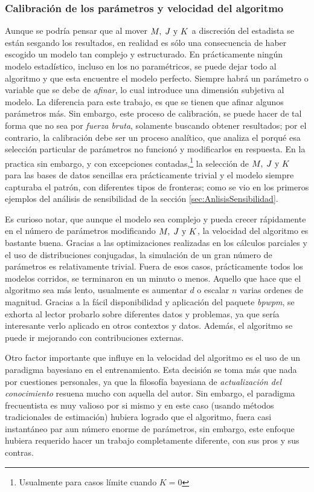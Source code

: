 \documentclass[../Main/Main.tex]{subfiles}
\begin{document}
\subsubsection*{Calibración de los parámetros y velocidad del algoritmo}
Aunque se podría pensar que al mover $M,\;J\text{ y }K$ a discreción del estadista se están sesgando los resultados, en realidad es sólo una consecuencia de haber escogido un modelo tan complejo y estructurado. En prácticamente ningún modelo estadístico, incluso en los no paramétricos, se puede dejar todo al algoritmo y que esta encuentre el modelo perfecto. Siempre habrá un parámetro o variable que se debe de \textit{afinar}, lo cual introduce una dimensión subjetiva al modelo. La diferencia para este trabajo, es que se tienen que afinar algunos parámetros más. Sin embargo, este proceso de calibración, se puede hacer de tal forma que no sea por \textit{fuerza bruta}, solamente buscando obtener resultados; por el contrario, la calibración debe ser un proceso analítico, que analiza el porqué esa selección particular de parámetros no funcionó y modificarlos en respuesta. En la practica sin embargo, y con excepciones contadas,\footnote{Usualmente para casos límite cuando $K = 0$} la selección de $M,\;J\text{ y }K$ para las bases de datos sencillas era prácticamente trivial y el modelo siempre capturaba el patrón, con diferentes tipos de fronteras; como se vio en los primeros ejemplos del análisis de sensibilidad de la sección \ref{sec:AnlisisSensibilidad}.

Es curioso notar, que aunque el modelo sea complejo y pueda crecer rápidamente en el número de parámetros modificando $M,\;J\text{ y }K$, la velocidad del algoritmo es bastante buena. Gracias a las optimizaciones realizadas en los cálculos parciales y el uso de distribuciones conjugadas, la simulación de un gran número de parámetros es relativamente trivial. Fuera de esos casos, prácticamente todos los modelos corridos, se terminaron en un minuto o menos. Aquello que hace que el algoritmo sea más lento, usualmente es aumentar $d$ o escalar $n$ varias ordenes de magnitud. Gracias a la fácil disponibilidad y aplicación del paquete \textit{bpwpm}, se exhorta al lector probarlo sobre diferentes datos y problemas, ya que sería interesante verlo aplicado en otros contextos y datos. Además,  el algoritmo se puede ir mejorando con contribuciones externas.

Otro factor importante que influye en la velocidad del algoritmo es el uso de un paradigma bayesiano en el entrenamiento. Esta decisión se toma más que nada por cuestiones personales, ya que la filosofía bayesiana de \textit{actualización del conocimiento} resuena mucho con aquella del autor. Sin embargo, el paradigma frecuentista es muy valioso por si mismo y en este caso (usando métodos tradicionales de estimación) hubiera logrado que el algoritmo, fuera casi instantáneo par aun número enorme de parámetros, sin embargo, este enfoque hubiera requerido hacer un trabajo completamente diferente, con sus pros y sus contras. 
\end{document}
